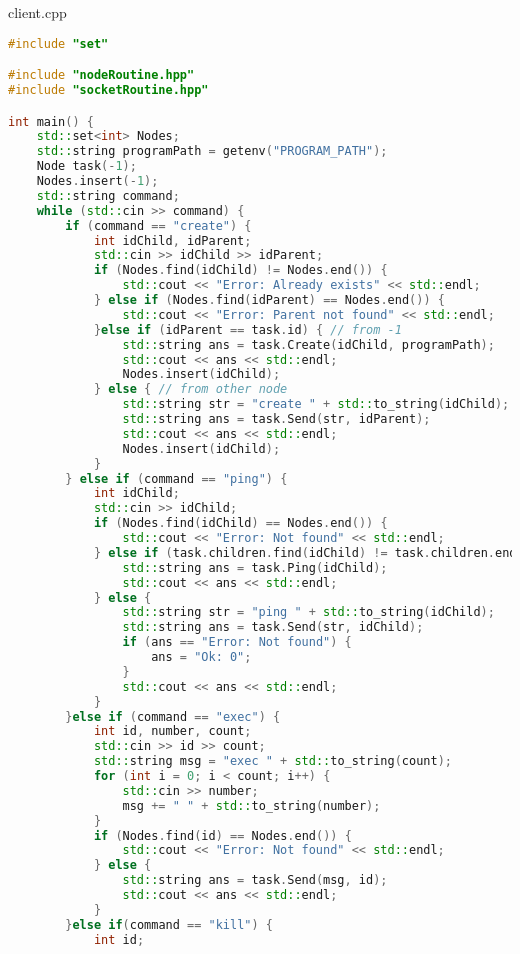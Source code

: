 \documentclass[a4paper, 12pt]{article}
\begin{document}
client.cpp
\begin{lstlisting}[language=C++]
#include "set"

#include "nodeRoutine.hpp"
#include "socketRoutine.hpp"

int main() {
    std::set<int> Nodes;
    std::string programPath = getenv("PROGRAM_PATH");
    Node task(-1);
    Nodes.insert(-1);
    std::string command;
    while (std::cin >> command) {
        if (command == "create") {
            int idChild, idParent;
            std::cin >> idChild >> idParent;
            if (Nodes.find(idChild) != Nodes.end()) {
                std::cout << "Error: Already exists" << std::endl;
            } else if (Nodes.find(idParent) == Nodes.end()) {
                std::cout << "Error: Parent not found" << std::endl;
            }else if (idParent == task.id) { // from -1
                std::string ans = task.Create(idChild, programPath);
                std::cout << ans << std::endl;
                Nodes.insert(idChild);
            } else { // from other node
                std::string str = "create " + std::to_string(idChild);
                std::string ans = task.Send(str, idParent);
                std::cout << ans << std::endl;
                Nodes.insert(idChild);
            }   
        } else if (command == "ping") {
            int idChild;
            std::cin >> idChild;
            if (Nodes.find(idChild) == Nodes.end()) {
                std::cout << "Error: Not found" << std::endl;
            } else if (task.children.find(idChild) != task.children.end()) {
                std::string ans = task.Ping(idChild);
                std::cout << ans << std::endl;
            } else {
                std::string str = "ping " + std::to_string(idChild);
                std::string ans = task.Send(str, idChild);
                if (ans == "Error: Not found") {
                    ans = "Ok: 0";
                }
                std::cout << ans << std::endl;
            }
        }else if (command == "exec") {
            int id, number, count;
            std::cin >> id >> count;
            std::string msg = "exec " + std::to_string(count); 
            for (int i = 0; i < count; i++) {
                std::cin >> number;
                msg += " " + std::to_string(number);
            }
            if (Nodes.find(id) == Nodes.end()) {
                std::cout << "Error: Not found" << std::endl;
            } else {
                std::string ans = task.Send(msg, id);
                std::cout << ans << std::endl;
            }
        }else if(command == "kill") {
            int id;

\end{lstlisting}
\end{document}
